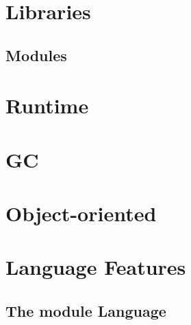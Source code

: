 \documentclass[svgnames,12pt,a4paper]{book}
\begin{document}
  
  
  
  

\chapter{Libraries}


















\section{Modules}


\chapter{Runtime}
\label{sec:runtime}



\chapter{GC}
\label{sec:gc}



\chapter{Object-oriented}



\chapter{Language Features}
\label{sec:compl-lang-feat}










\section{The module Language}
\label{sec:module-language}
\end{document}
